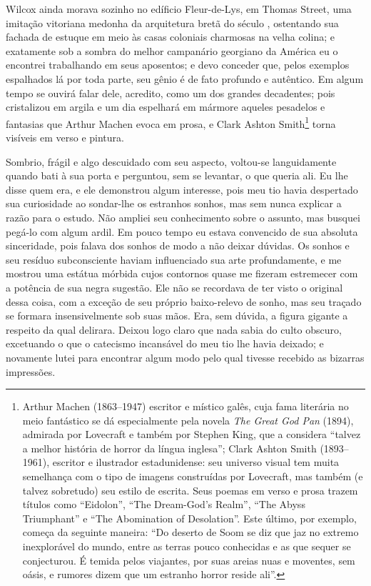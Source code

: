 Wilcox ainda morava sozinho no edíficio Fleur-de-Lys, em Thomas Street,
uma imitação vitoriana medonha da arquitetura bretã do século ,
ostentando sua fachada de estuque em meio às casas coloniais charmosas
na velha colina; e exatamente sob a sombra do melhor campanário
georgiano da América eu o encontrei trabalhando em seus aposentos; e
devo conceder que, pelos exemplos espalhados lá por toda parte, seu
gênio é de fato profundo e autêntico. Em algum tempo se ouvirá falar
dele, acredito, como um dos grandes decadentes; pois cristalizou em
argila e um dia espelhará em mármore aqueles pesadelos e fantasias que
Arthur Machen evoca em prosa, e Clark Ashton Smith\footnote{Arthur
  Machen (1863--1947) escritor e místico galês, cuja fama literária no
  meio fantástico se dá especialmente pela novela \emph{The Great God
  Pan} (1894), admirada por Lovecraft e também por Stephen King, que a
  considera ``talvez a melhor história de horror da língua inglesa'';
  Clark Ashton Smith (1893--1961), escritor e ilustrador estadunidense:
  seu universo visual tem muita semelhança com o tipo de imagens
  construídas por Lovecraft, mas também (e talvez sobretudo) seu estilo
  de escrita. Seus poemas em verso e prosa trazem títulos como
  ``Eidolon'', ``The Dream-God's Realm'', ``The Abyss Triumphant'' e
  ``The Abomination of Desolation''. Este último, por exemplo, começa da
  seguinte maneira: ``Do deserto de Soom se diz que jaz no extremo
  inexplorável do mundo, entre as terras pouco conhecidas e as que
  sequer se conjecturou. É temida pelos viajantes, por suas areias nuas
  e moventes, sem oásis, e rumores dizem que um estranho horror reside
  ali''.} torna visíveis em verso e pintura.

Sombrio, frágil e algo descuidado com seu aspecto, voltou-se
languidamente quando bati à sua porta e perguntou, sem se levantar, o
que queria ali. Eu lhe disse quem era, e ele demonstrou algum interesse,
pois meu tio havia despertado sua curiosidade ao sondar-lhe os estranhos
sonhos, mas sem nunca explicar a razão para o estudo. Não ampliei seu
conhecimento sobre o assunto, mas busquei pegá-lo com algum ardil. Em
pouco tempo eu estava convencido de sua absoluta sinceridade, pois
falava dos sonhos de modo a não deixar dúvidas. Os sonhos e seu resíduo
subconsciente haviam influenciado sua arte profundamente, e me mostrou
uma estátua mórbida cujos contornos quase me fizeram estremecer com a
potência de sua negra sugestão. Ele não se recordava de ter visto o
original dessa coisa, com a exceção de seu próprio baixo-relevo de
sonho, mas seu traçado se formara insensivelmente sob suas mãos. Era,
sem dúvida, a figura gigante a respeito da qual delirara. Deixou logo
claro que nada sabia do culto obscuro, excetuando o que o catecismo
incansável do meu tio lhe havia deixado; e novamente lutei para
encontrar algum modo pelo qual tivesse recebido as bizarras impressões.

